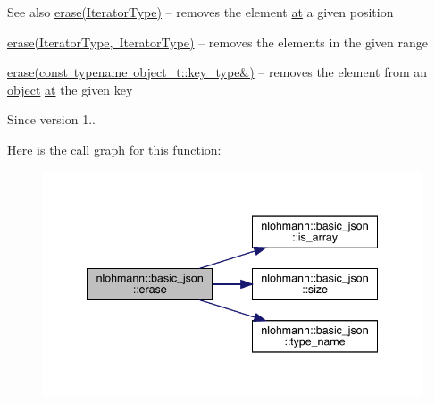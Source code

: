 \begin{DoxySeeAlso}{See also}
\mbox{\hyperlink{classnlohmann_1_1basic__json_a068a16e76be178e83da6a192916923ed}{erase(\+Iterator\+Type)}} -- removes the element \mbox{\hyperlink{classnlohmann_1_1basic__json_a73ae333487310e3302135189ce8ff5d8}{at}} a given position 

\mbox{\hyperlink{classnlohmann_1_1basic__json_a4b3f7eb2d4625d95a51fbbdceb7c5f39}{erase(\+Iterator\+Type, Iterator\+Type)}} -- removes the elements in the given range 

\mbox{\hyperlink{classnlohmann_1_1basic__json_a2f8484d69c55d8f2a9697a7bec29362a}{erase(const typename object\+\_\+t\+::key\+\_\+type\&)}} -- removes the element from an \mbox{\hyperlink{classnlohmann_1_1basic__json_a9f42ee7d10eee2d5a73fd94ca7f767ca}{object}} \mbox{\hyperlink{classnlohmann_1_1basic__json_a73ae333487310e3302135189ce8ff5d8}{at}} the given key
\end{DoxySeeAlso}
\begin{DoxySince}{Since}
version 1.. 
\end{DoxySince}
Here is the call graph for this function\+:
\nopagebreak
\begin{figure}[H]
\begin{center}
\leavevmode
\includegraphics[width=341pt]{classnlohmann_1_1basic__json_a88cbcefe9a3f4d294bed0653550a5cb9_cgraph}
\end{center}
\end{figure}
\mbox{\label{classnlohmann_1_1basic__json_aeed33787bd362c7ead59a4ba945392db}} 
